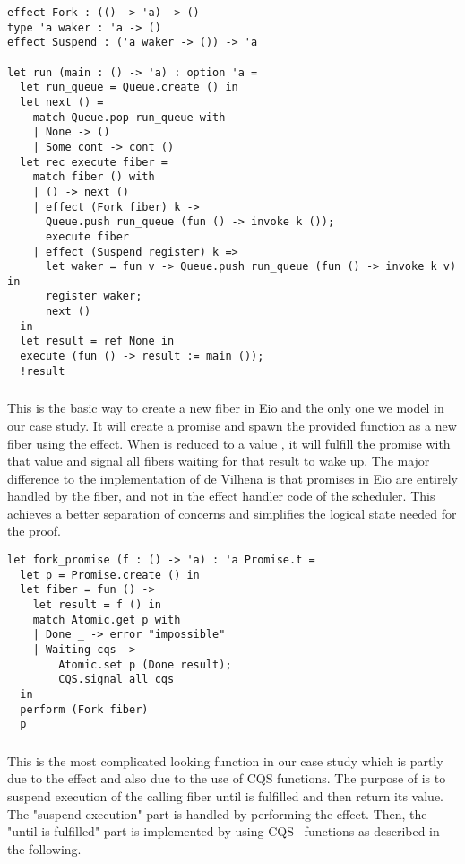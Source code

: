 \begin{verbatim}
effect Fork : (() -> 'a) -> ()
type 'a waker : 'a -> ()
effect Suspend : ('a waker -> ()) -> 'a

let run (main : () -> 'a) : option 'a =
  let run_queue = Queue.create () in
  let next () =
    match Queue.pop run_queue with
    | None -> ()
    | Some cont -> cont ()
  let rec execute fiber =
    match fiber () with
    | () -> next ()
    | effect (Fork fiber) k ->
      Queue.push run_queue (fun () -> invoke k ());
      execute fiber
    | effect (Suspend register) k =>
      let waker = fun v -> Queue.push run_queue (fun () -> invoke k v) in
      register waker;
      next ()
  in
  let result = ref None in
  execute (fun () -> result := main ());
  !result
\end{verbatim}

\subsubsection{}
\label{sec:sched-impl-fork}

This is the basic way to create a new fiber in Eio and the only one we model in our case study.
It will create a promise and spawn the provided function as a new fiber using the \efork{} effect.
When  is reduced to a value , it will fulfill the promise with that value and signal all fibers waiting for that result to wake up.
The major difference to the implementation of de Vilhena is that promises in Eio are entirely handled by the fiber, and not in the effect handler code of the scheduler.
This achieves a better separation of concerns and simplifies the logical state needed for the proof.

\begin{verbatim}
let fork_promise (f : () -> 'a) : 'a Promise.t =
  let p = Promise.create () in
  let fiber = fun () ->
    let result = f () in
    match Atomic.get p with
    | Done _ -> error "impossible"
    | Waiting cqs ->
        Atomic.set p (Done result);
        CQS.signal_all cqs 
  in
  perform (Fork fiber) 
  p
\end{verbatim}

\subsubsection{}
\label{sec:sched-impl-await}

This is the most complicated looking function in our case study which is partly due to the \esuspend{} effect and also due to the use of CQS functions.
The purpose of  is to suspend execution of the calling fiber until  is fulfilled and then return its value.
The "suspend execution" part is handled by performing the \esuspend{} effect.
Then, the "until  is fulfilled" part is implemented by using CQS~\cite{koval2023cqs} functions as described in the following.

